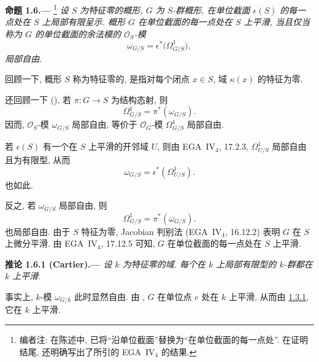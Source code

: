 \medskip
{}\label{prop:sga3-VIB-1.6}%
\noindent\textbf{命题 1.6.---}%
\footnote{\label{note:sga3-VIB-18}编者注:
在陈述中, 已将``沿单位截面''替换为``在单位截面的每一点处''.
在证明结尾, 还明确写出了所引的 EGA~IV\(_4\) 的结果.}
\emph{设 \(S\) 为特征零的概形, \(G\) 为 \(S\)-群概形,
在单位截面 \(\epsilon(S)\) 的每一点处在 \(S\) 上局部有限呈示.
概形 \(G\) 在单位截面的每一点处在 \(S\) 上平滑,
当且仅当称为 \(G\) 的单位截面的余法模的 \(\mathcal O_S\)-模}
\[
  \omega_{G/S}
    =\epsilon^*\bigl(\Omega^1_{G/S}\bigr),
\]
\emph{局部自由.}

回顾一下, 概形 \(S\) 称为特征零的,
是指对每个闭点 \(x\in S\), 域 \(\kappa(x)\) 的特征为零.

还回顾一下 (),
若 \(\pi:G\to S\) 为结构态射, 则
\[
  \Omega^1_{G/S}=\pi^*(\omega_{G/S}).
\]
因而, \(\mathcal O_S\)-模 \(\omega_{G/S}\) 局部自由,
等价于 \(\mathcal O_G\)-模 \(\Omega^1_{G/S}\) 局部自由.

若 \(\epsilon(S)\) 有一个在 \(S\) 上平滑的开邻域 \(U\),
则由 EGA~IV\(_4\), 17.2.3, \(\Omega^1_{U/S}\) 局部自由且为有限型,
从而
\[
  \omega_{G/S}=\epsilon^*(\Omega^1_{U/S}).
\]
也如此.

反之, 若 \(\omega_{G/S}\) 局部自由, 则
\[
  \Omega^1_{G/S}=\pi^*(\omega_{G/S}).
\]
也局部自由. 由于 \(S\) 特征为零, Jacobian 判别法
(EGA~IV\(_4\), 16.12.2) 表明 \(G\) 在 \(S\) 上微分平滑.
由 EGA~IV\(_4\), 17.12.5 可知,
\(G\) 在单位截面的每一点处在 \(S\) 上平滑.

\medskip
{}\label{cor:sga3-VIB-1.6.1}%
\noindent\textbf{推论 1.6.1 (Cartier).---}
\emph{设 \(k\) 为特征零的域.
每个在 \(k\) 上局部有限型的 \(k\)-群都在 \(k\) 上平滑.}

事实上, \(k\)-模 \(\omega_{G/k}\) 此时显然自由.
由 , \(G\) 在单位点 \(e\)
处在 \(k\) 上平滑, 从而由 \hyperref[cor:sga3-VIB-1.3.1]{1.3.1},
它在 \(k\) 上平滑.
